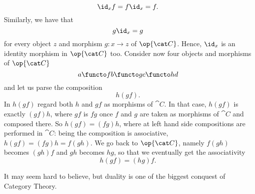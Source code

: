 \[\id_x f = f \id_x = f .\]
Similarly, we have that
\[g \id_x = g\] for every object \(z\) and morphism \(g : x \to z\) of
\(\op{\cat C}\). Hence, \(\id_x\) is an identity morphism in
\(\op{\cat C}\) too. Consider now four objects and morphisms of
\(\op{\cat C}\)
\[a \functo f b \functo g c \functo h d\] and let us parse the
composition
\[h(gf) .\] In \(h(gf)\) regard both \(h\) and \(gf\) as morphisms of
\(\cat C\). In that case, \(h(gf)\) is exactly \((gf)h\), where \(gf\)
is \(fg\) once \(f\) and \(g\) are taken as morphisms of \(\cat C\)
and composed there. So \(h(gf) = (fg)h\), where at left hand side
compositions are performed in \(\cat C\): being the composition is
associative, \(h(gf) = (fg)h = f(gh)\). We go back to \(\op{\cat C}\),
namely \(f(gh)\) becomes \((gh)f\) and \(gh\) becomes \(hg\), so that
we eventually get the associativity
\[h(gf) = (hg) f .\]

It may seem hard to believe, but duality is one of the biggest
conquest of Category Theory. \NotaInterna{\dots{}}

